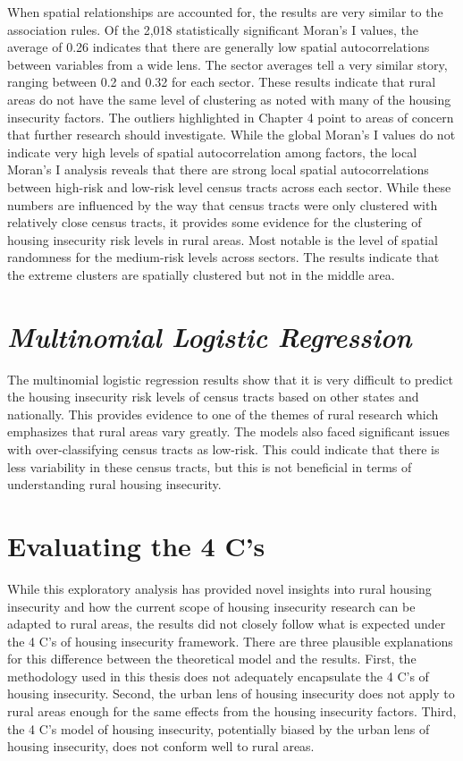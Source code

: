 When spatial relationships are accounted for, the results are very similar to the association rules. Of the 2,018 statistically significant Moran's I values, the average of 0.26 indicates that there are generally low spatial autocorrelations between variables from a wide lens. The sector averages tell a very similar story, ranging between 0.2 and 0.32 for each sector. These results indicate that rural areas do not have the same level of clustering as noted with many of the housing insecurity factors. The outliers highlighted in Chapter 4 point to areas of concern that further research should investigate. While the global Moran's I values do not indicate very high levels of spatial autocorrelation among factors, the local Moran's I analysis reveals that there are strong local spatial autocorrelations between high-risk and low-risk level census tracts across each sector. While these numbers are influenced by the way that census tracts were only clustered with relatively close census tracts, it provides some evidence for the clustering of housing insecurity risk levels in rural areas. Most notable is the level of spatial randomness for the medium-risk levels across sectors. The results indicate that the extreme clusters are spatially clustered but not in the middle area. 


\section{\textit{Multinomial Logistic Regression}}

The multinomial logistic regression results show that it is very difficult to predict the housing insecurity risk levels of census tracts based on other states and nationally. This provides evidence to one of the themes of rural research which emphasizes that rural areas vary greatly. The models also faced significant issues with over-classifying census tracts as low-risk. This could indicate that there is less variability in these census tracts, but this is not beneficial in terms of understanding rural housing insecurity. 

\section{Evaluating the 4 C's}

While this exploratory analysis has provided novel insights into rural housing insecurity and how the current scope of housing insecurity research can be adapted to rural areas, the results did not closely follow what is expected under the 4 C's of housing insecurity framework. There are three plausible explanations for this difference between the theoretical model and the results. First, the methodology used in this thesis does not adequately encapsulate the 4 C's of housing insecurity. Second, the urban lens of housing insecurity does not apply to rural areas enough for the same effects from the housing insecurity factors. Third, the 4 C's model of housing insecurity, potentially biased by the urban lens of housing insecurity, does not conform well to rural areas. 

